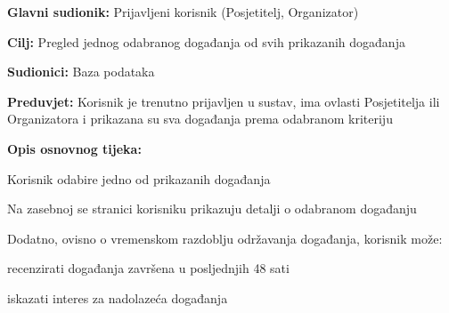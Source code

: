 
					\noindent {}
					\begin{packed_item}
						
						\item \textbf{Glavni sudionik: } Prijavljeni korisnik (Posjetitelj, Organizator)
						\item  \textbf{Cilj:} Pregled jednog odabranog događanja od svih prikazanih događanja
						\item  \textbf{Sudionici:} Baza podataka
						\item  \textbf{Preduvjet:} Korisnik je trenutno prijavljen u sustav, ima ovlasti Posjetitelja ili Organizatora i prikazana su sva događanja prema odabranom kriteriju
						\item  \textbf{Opis osnovnog tijeka:}
						
						\item[] \begin{packed_enum}
							
							\item Korisnik odabire jedno od prikazanih događanja
							\item Na zasebnoj se stranici korisniku prikazuju detalji o odabranom događanju
							\item Dodatno, ovisno o vremenskom razdoblju održavanja događanja, korisnik može:
							
							\item[] \begin{packed_enum}
								
								\item recenzirati događanja završena u posljednjih 48 sati 
								\item iskazati interes za nadolazeća događanja
							\end{packed_enum}
							
						\end{packed_enum}
						
					\end{packed_item}
					
					
